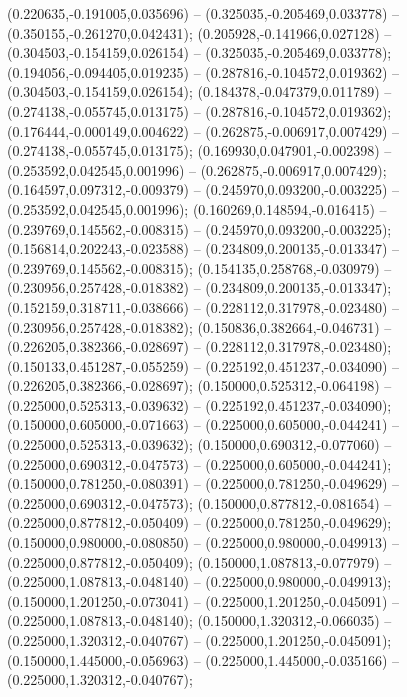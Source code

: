  (0.220635,-0.191005,0.035696) -- (0.325035,-0.205469,0.033778) -- (0.350155,-0.261270,0.042431);
 (0.205928,-0.141966,0.027128) -- (0.304503,-0.154159,0.026154) -- (0.325035,-0.205469,0.033778);
 (0.194056,-0.094405,0.019235) -- (0.287816,-0.104572,0.019362) -- (0.304503,-0.154159,0.026154);
 (0.184378,-0.047379,0.011789) -- (0.274138,-0.055745,0.013175) -- (0.287816,-0.104572,0.019362);
 (0.176444,-0.000149,0.004622) -- (0.262875,-0.006917,0.007429) -- (0.274138,-0.055745,0.013175);
 (0.169930,0.047901,-0.002398) -- (0.253592,0.042545,0.001996) -- (0.262875,-0.006917,0.007429);
 (0.164597,0.097312,-0.009379) -- (0.245970,0.093200,-0.003225) -- (0.253592,0.042545,0.001996);
 (0.160269,0.148594,-0.016415) -- (0.239769,0.145562,-0.008315) -- (0.245970,0.093200,-0.003225);
 (0.156814,0.202243,-0.023588) -- (0.234809,0.200135,-0.013347) -- (0.239769,0.145562,-0.008315);
 (0.154135,0.258768,-0.030979) -- (0.230956,0.257428,-0.018382) -- (0.234809,0.200135,-0.013347);
 (0.152159,0.318711,-0.038666) -- (0.228112,0.317978,-0.023480) -- (0.230956,0.257428,-0.018382);
 (0.150836,0.382664,-0.046731) -- (0.226205,0.382366,-0.028697) -- (0.228112,0.317978,-0.023480);
 (0.150133,0.451287,-0.055259) -- (0.225192,0.451237,-0.034090) -- (0.226205,0.382366,-0.028697);
 (0.150000,0.525312,-0.064198) -- (0.225000,0.525313,-0.039632) -- (0.225192,0.451237,-0.034090);
 (0.150000,0.605000,-0.071663) -- (0.225000,0.605000,-0.044241) -- (0.225000,0.525313,-0.039632);
 (0.150000,0.690312,-0.077060) -- (0.225000,0.690312,-0.047573) -- (0.225000,0.605000,-0.044241);
 (0.150000,0.781250,-0.080391) -- (0.225000,0.781250,-0.049629) -- (0.225000,0.690312,-0.047573);
 (0.150000,0.877812,-0.081654) -- (0.225000,0.877812,-0.050409) -- (0.225000,0.781250,-0.049629);
 (0.150000,0.980000,-0.080850) -- (0.225000,0.980000,-0.049913) -- (0.225000,0.877812,-0.050409);
 (0.150000,1.087813,-0.077979) -- (0.225000,1.087813,-0.048140) -- (0.225000,0.980000,-0.049913);
 (0.150000,1.201250,-0.073041) -- (0.225000,1.201250,-0.045091) -- (0.225000,1.087813,-0.048140);
 (0.150000,1.320312,-0.066035) -- (0.225000,1.320312,-0.040767) -- (0.225000,1.201250,-0.045091);
 (0.150000,1.445000,-0.056963) -- (0.225000,1.445000,-0.035166) -- (0.225000,1.320312,-0.040767);

